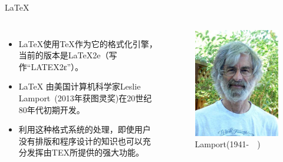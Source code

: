 \documentclass[13pt]{ctexbeamer}
\begin{document}
\begin{frame}{LaTeX}
	\begin{columns}[c]  %

		\column{6cm}

\begin{itemize}
		\item LaTeX使用TeX作为它的格式化引擎，当前的版本是LaTeX2e（写作“LATEX2ε”）。

	\item LaTeX 由美国计算机科学家Leslie~ Lamport~(2013年获图灵奖)在20世纪80年代初期开发。
	\item 利用这种格式系统的处理，即使用户没有排版和程序设计的知识也可以充分发挥由TEX所提供的强大功能。
\end{itemize}


		\column{5cm}
		\begin{figure}[p]
			\includegraphics[scale=0.4]{Lamport.jpg}
			\caption{Lamport(1941-~~)}
		\end{figure}

	\end{columns}


\end{frame}


%
%
%
%
%
%
%
%
\end{document}
